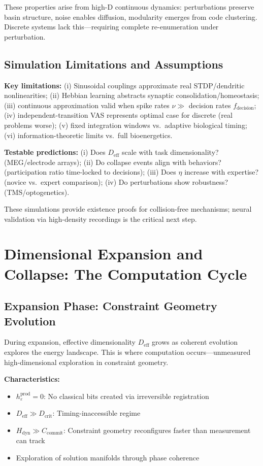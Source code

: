 \documentclass[12pt]{article}
\begin{document}
These properties arise from high-D continuous dynamics: perturbations preserve basin structure, noise enables diffusion, modularity emerges from code clustering. Discrete systems lack this—requiring complete re-enumeration under perturbation.

\subsection{Simulation Limitations and Assumptions}

\textbf{Key limitations:} (i) Sinusoidal couplings approximate real STDP/dendritic nonlinearities; (ii) Hebbian learning abstracts synaptic consolidation/homeostasis; (iii) continuous approximation valid when spike rates $\nu \gg$ decision rates $f_{\text{decision}}$; (iv) independent-transition VAS represents optimal case for discrete (real problems worse); (v) fixed integration windows vs.\ adaptive biological timing; (vi) information-theoretic limits vs.\ full bioenergetics.

\textbf{Testable predictions:} (i) Does $D_{\text{eff}}$ scale with task dimensionality? (MEG/electrode arrays); (ii) Do collapse events align with behaviors? (participation ratio time-locked to decisions); (iii) Does $\eta$ increase with expertise? (novice vs.\ expert comparison); (iv) Do perturbations show robustness? (TMS/optogenetics).

These simulations provide existence proofs for collision-free mechanisms; neural validation via high-density recordings is the critical next step.

\section{Dimensional Expansion and Collapse: The Computation Cycle}

\subsection{Expansion Phase: Constraint Geometry Evolution}

During expansion, effective dimensionality $D_{\text{eff}}$ grows as coherent evolution explores the energy landscape. This is where computation occurs---unmeasured high-dimensional exploration in constraint geometry.

\textbf{Characteristics:}
\begin{itemize}
\item $h_\varepsilon^{\text{prod}} = 0$: No classical bits created via irreversible registration
\item $D_{\text{eff}} \gg D_{\text{crit}}$: Timing-inaccessible regime
\item $H_{\text{dyn}} \gg C_{\text{commit}}$: Constraint geometry reconfigures faster than measurement can track
\item Exploration of solution manifolds through phase coherence
\end{itemize}
\end{document}
